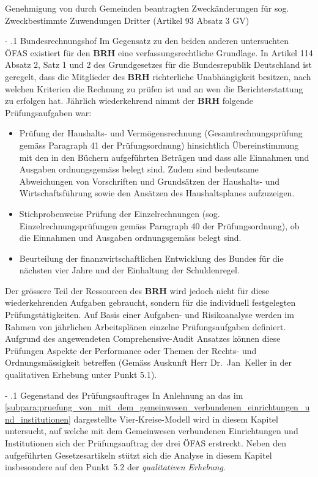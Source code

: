 \documentclass[10pt]{article}
\makeatletter
\renewcommand\paragraph{\@startsection{paragraph}{3}{0mm}{-\baselineskip}{.1\baselineskip}{\normalfont\normalsize\bfseries}}
\renewcommand\subparagraph{\@startsection{subparagraph}{4}{0mm}{-\baselineskip}{.1\baselineskip}{\normalfont\normalsize\bfseries}}
\renewcommand\paragraph{%
\@startsection{paragraph}{3}{0mm}%
{-\baselineskip}%
{.1\baselineskip}%
{\normalfont\normalsize\bfseries}}
\renewcommand\subparagraph{%
\@startsection{subparagraph}{4}{0mm}%
{-\baselineskip}%
{.1\baselineskip}%
{\normalfont\normalsize\bfseries}}
\makeatother
\begin{document}
Genehmigung von durch Gemeinden beantragten Zweckänderungen für sog. Zweckbestimmte Zuwendungen Dritter (Artikel 93 Absatz 3 GV)

\subparagraph{Bundesrechnungshof}\label{subpara:bundesrechnungshof}
Im Gegensatz zu den beiden anderen untersuchten ÖFAS existiert für den \textbf{BRH} eine verfassungsrechtliche Grundlage. In Artikel 114 Absatz 2, Satz 1 und 2 des Grundgesetzes für die Bundesrepublik Deutschland ist geregelt, dass die Mitglieder des \textbf{BRH} richterliche Unabhängigkeit besitzen, nach welchen Kriterien die Rechnung zu prüfen ist und an wen die Berichterstattung zu erfolgen hat. Jährlich wiederkehrend nimmt der \textbf{BRH} folgende Prüfungsaufgaben war: 

\begin{itemize}
    \item Prüfung der Haushalts- und Vermögensrechnung (Gesamtrechnungsprüfung gemäss Paragraph 41 der Prüfungsordnung) hinsichtlich Übereinstimmung mit den in den Büchern aufgeführten Beträgen und dass alle Einnahmen und Ausgaben ordnungsgemäss belegt sind. Zudem sind bedeutsame Abweichungen von Vorschriften und Grundsätzen der Haushalts- und Wirtschaftsführung sowie den Ansätzen des Haushaltsplanes aufzuzeigen.

    \item Stichprobenweise Prüfung der Einzelrechnungen (sog. Einzelrechnungsprüfungen gemäss Paragraph 40 der Prüfungsordnung), ob die Einnahmen und Ausgaben ordnungsgemäss belegt sind.

    \item Beurteilung der finanzwirtschaftlichen Entwicklung des Bundes für die nächsten vier Jahre und der Einhaltung der Schuldenregel.

\end{itemize}

Der grössere Teil der Ressourcen des \textbf{BRH} wird jedoch nicht für diese wiederkehrenden Aufgaben gebraucht, sondern für die individuell festgelegten Prüfungstätigkeiten. Auf Basis einer Aufgaben- und Risikoanalyse werden im Rahmen von jährlichen Arbeitsplänen einzelne Prüfungsaufgaben definiert. Aufgrund des angewendeten Comprehensive-Audit Ansatzes können diese Prüfungen Aspekte der Performance oder Themen der Rechts- und Ordnungsmässigkeit betreffen (Gemäss Auskunft Herr Dr.~Jan~Keller in der qualitativen Erhebung unter Punkt 5.1).

\paragraph{Gegenstand des Prüfungsauftrages}\label{para:gegenstand_des_pruefungsauftrages}
In Anlehnung an das im \vref{subpara:pruefung_von_mit_dem_gemeinwesen_verbundenen_einrichtungen_und_institutionen} dargestellte Vier-Kreise-Modell wird in diesem Kapitel untersucht, auf welche mit dem Gemeinwesen verbundenen Einrichtungen und Institutionen sich der Prüfungsauftrag der drei ÖFAS erstreckt. Neben den aufgeführten Gesetzesartikeln stützt sich die Analyse in diesem Kapitel insbesondere auf den Punkt~5.2 der \textit{qualitativen Erhebung}.
\end{document}
